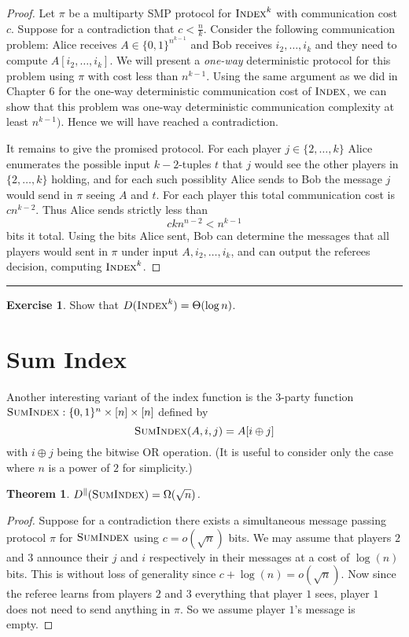 \documentclass[11pt]{amsart}
\theoremstyle{plain}
\newtheorem{theorem}{Theorem}
\theoremstyle{definition}
\newtheorem{exercise}{Exercise}
\theoremstyle{plain}
\newcommand{\Index}{\textsc{Index}}
\newcommand{\SumIndex}{\textsc{SumIndex}}
\newcommand{\exercises}{\bigskip \noindent\rule{8cm}{0.4pt} \medskip}
\begin{document}
\begin{proof}
Let $\pi$ be a multiparty SMP protocol for $\Index^k$ with communication cost $c$. Suppose for a contradiction that $c < \frac{n}{k}$. Consider the following communication problem: Alice receives $A \in \{0,1\}^{n^{k-1}}$ and Bob receives $i_2,\dots, i_k$ and they need to compute $A[i_2,\dots, i_k]$. We will present a \emph{one-way} deterministic protocol for this problem using $\pi$ with cost less than $n^{k-1}$. Using the same argument as we did in Chapter $6$ for the one-way deterministic communication cost of $\Index$, we can show that this problem was one-way deterministic communication complexity at least $n^{{k-1}})$. Hence we will have reached a contradiction.

It remains to give the promised protocol. For each player $j \in \{2, \dots, k\}$ Alice enumerates the possible input $k-2$-tuples $t$ that $j$ would see the other players in $\{2,\dots, k\}$ holding, and for each such possiblity Alice sends to Bob the message $j$ would send in $\pi$ seeing $A$ and $t$. For each player this total communication cost is $cn^{k-2}$. Thus Alice sends strictly less than
$$ckn^{n-2} < n^{k-1}$$
bits it total.
Using the bits Alice sent, Bob can determine the messages that all players would sent in $\pi$ under input $A,i_2,\dots, i_k$, and can output the referees decision, computing $\Index^k$.
\end{proof}

\exercises

\begin{exercise}
Show that $D(\Index^k) = \Theta(\log n)$.
\end{exercise}


\newpage 
\section{Sum Index}

Another interesting variant of the index function is the 3-party function $\SumIndex : \{0,1\}^n \times [n] \times [n]$ defined by
\[
\SumIndex(A,i,j) = A[ i \oplus j]
\]
with $i \oplus j$ being the bitwise OR operation. (It is useful to consider only the case where $n$ is a power of $2$ for simplicity.)

\begin{theorem}
$D^\parallel(\SumIndex) = \Omega(\sqrt{n})$.
\end{theorem}

\begin{proof}
Suppose for a contradiction there exists a simultaneous message passing protocol $\pi$ for $\SumIndex$ using $c = o(\sqrt{n})$ bits. We may assume that players $2$ and $3$ announce their $j$ and $i$ respectively in their messages at a cost of $\log(n)$ bits. This is without loss of generality since $c + \log(n) = o(\sqrt{n})$. Now since the referee learns from players $2$ and $3$ everything that player $1$ sees, player $1$ does not need to send anything in $\pi$. So we assume player $1$'s message is empty.

\end{proof}
\end{document}
